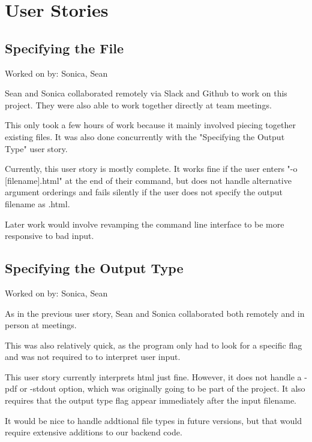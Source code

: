 \section{User Stories}

\subsection{Specifying the File}

Worked on by: Sonica, Sean

Sean and Sonica collaborated remotely via Slack and Github to work on this project. They were also able to work together directly at team meetings.

This only took a few hours of work because it mainly involved piecing together existing files. It was also done concurrently with the "Specifying the Output Type" user story.

Currently, this user story is mostly complete. It works fine if the user enters "-o [filename].html" at the end of their command, but does not handle alternative argument orderings and fails silently if the user does not specify the output filename as .html.

Later work would involve revamping the command line interface to be more responsive to bad input.

\subsection{Specifying the Output Type}

Worked on by: Sonica, Sean

As in the previous user story, Sean and Sonica collaborated both remotely and in person at meetings.

This was also relatively quick, as the program only had to look for a specific flag and was not required to to interpret user input.

This user story currently interprets html just fine. However, it does not handle a -pdf or -stdout option, which was originally going to be part of the project. It also requires that the output type flag appear immediately after the input filename.

It would be nice to handle addtional file types in future versions, but that would require extensive additions to our backend code.



